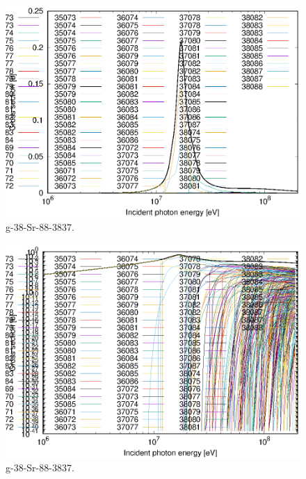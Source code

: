 \begin{figure}
 \includegraphics[width=\linewidth]{eps/g_38-Sr-88_3837.eps}
  \caption{g-38-Sr-88-3837.}
\end{figure}
\begin{figure}
 \includegraphics[width=\linewidth]{eps-log/g_38-Sr-88_3837.eps}
 \caption{g-38-Sr-88-3837.}
\end{figure}
\newpage \clearpage


